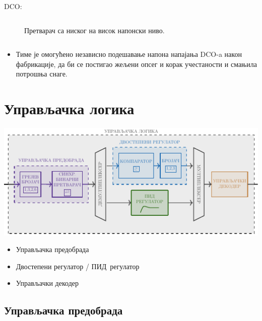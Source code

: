 \documentclass[aspectratio=169]{beamer}
\def \DCO  {DCO} %
\def \PID  {ПИД} %
\begin{document}
\begin{frame}{\DCO: \subsecname}
\begin{columns}[t]
\begin{column}{0.5\textwidth}
\begin{figure}[!h]
                \caption{Претварач са ниског на висок напонски ниво.}
                \label{Level_shifter_LH}
            \end{figure}
		\end{column}
	\end{columns}
    \begin{itemize}
        \item Тиме је омогућено независно подешавање напона напајања \DCO-a након фабрикације, да би се постигао жељени опсег и корак учестаности и смањила потрошња снаге. %
    \end{itemize}	
\end{frame}

\section{Управљачка логика}
\begin{frame}{\secname}
\centering
\includegraphics[scale=1]{slike/prezentacija/FLL_CTRL.pdf} 
\medskip
\begin{itemize}
	\item Управљачка предобрада
	\item Двостепени регулатор / \PID\ регулатор
	\item Управљачки декодер
\end{itemize}
\end{frame}

\subsection{Управљачка предобрада}
\end{document}

